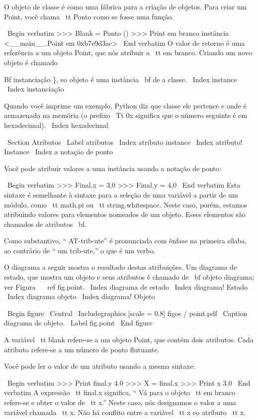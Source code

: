\documentclass[10pt]{book}
\begin{document}
\begin {itemize}
{{{{{{{{{{{O objeto de classe é como uma fábrica para a criação de objetos. Para criar um
Point, você chama {\ tt Ponto} como se fosse uma função.

\ Begin {verbatim}
>>> Blank = Ponto ()
>>> Print em branco
instância <__main__.Point em 0xb7e9d3ac>
\ End {verbatim}
%
O valor de retorno é uma referência a um objeto Point, que nós
atribuir a {\ tt em branco}.  
Criando um novo objeto é chamado
{Bf instanciação \}, eo objeto é uma instância {\ bf} de
a classe.
\ Index {instance}
\ Index {} instanciação

Quando você imprime um exemplo, Python diz que classe ele
pertence e onde é armazenada na memória (o prefixo
{\ Tt 0x} significa que o número seguinte é em hexadecimal).
\ Index {hexadecimal}


\ Section {Atributos}
\ Label {atributos}
\ Index {atributo instance}
\ Index {atributo! Instance}
\ Index {} a notação de ponto

Você pode atribuir valores a uma instância usando a notação de ponto:

\ Begin {verbatim}
>>> Final.x = 3,0
>>> Final.y = 4,0
\ End {verbatim}
%
Esta sintaxe é semelhante à sintaxe para a seleção de uma variável a partir de um
módulo, como {\ tt math.pi} ou {\ tt string.whitespace}. Neste caso,
porém, estamos atribuindo valores para elementos nomeados de um objeto.
Esses elementos são chamados de atributos {\ bf}.

Como substantivo, `` AT-trib-ute'' é pronunciada com ênfase na primeira
sílaba, ao contrário de `` um trib-ute,'' o que é um verbo.

O diagrama a seguir mostra o resultado destas atribuições.
Um diagrama de estado, que mostra um objeto e seus atributos é
chamado de {\ bf objeto diagrama}; ver Figura ~ \ ref {} fig.point.
\ Index {diagrama de estado}
\ Index {diagrama! Estado}
\ Index {diagrama objeto}
\ Index {diagrama! Objeto}

\ Begin {figure}
\ Central
{\ Includegraphics [scale = 0.8] {figos / point.pdf}}
\ Caption {diagrama de objeto.}
\ Label {} fig.point
\ End {figure}


A variável {\ tt blank} refere-se a um objeto Point, que
contém dois atributos. Cada atributo refere-se a um
número de ponto flutuante.

Você pode ler o valor de um atributo usando a mesma sintaxe:

\ Begin {verbatim}
>>> Print final.y
4.0
>>> X = final.x
>>> Print x
3.0
\ End {verbatim}
%
A expressão {\ tt final.x} significa, `` Vá para o objeto {\ tt em branco}
refere-se e obter o valor de {\ tt x}.'' Neste caso, nós designamos o
valor a uma variável chamada {\ tt x}. Não há conflito entre
a variável {\ tt x} eo atributo {\ tt x}.

}}}}}}}}}}}}
\end{itemize}
\end{document}
